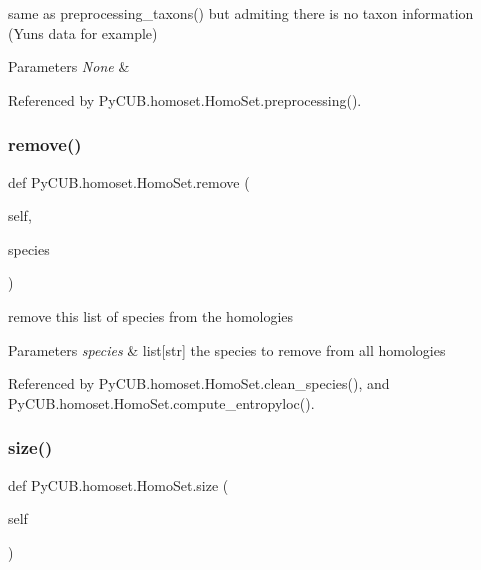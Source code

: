 same as preprocessing\+\_\+taxons() but admiting there is no taxon information (Yun\textquotesingle{}s data for example) 


\begin{DoxyParams}{Parameters}
{\em None} & \\
\hline
\end{DoxyParams}


Referenced by Py\+C\+U\+B.\+homoset.\+Homo\+Set.\+preprocessing().

\mbox{\label{class_py_c_u_b_1_1homoset_1_1_homo_set_af19ffd1cceb4b222e642713456b300a1}} 
\subsubsection{\texorpdfstring{remove()}{remove()}}
{\footnotesize\ttfamily def Py\+C\+U\+B.\+homoset.\+Homo\+Set.\+remove (\begin{DoxyParamCaption}\item[{}]{self,  }\item[{}]{species }\end{DoxyParamCaption})}



remove this list of species from the homologies 


\begin{DoxyParams}{Parameters}
{\em species} & list\mbox{[}str\mbox{]} the species to remove from all homologies \\
\hline
\end{DoxyParams}


Referenced by Py\+C\+U\+B.\+homoset.\+Homo\+Set.\+clean\+\_\+species(), and Py\+C\+U\+B.\+homoset.\+Homo\+Set.\+compute\+\_\+entropyloc().

\mbox{\label{class_py_c_u_b_1_1homoset_1_1_homo_set_a000511647e3f85d8abadcdddaddfb04d}} 
\subsubsection{\texorpdfstring{size()}{size()}}
{\footnotesize\ttfamily def Py\+C\+U\+B.\+homoset.\+Homo\+Set.\+size (\begin{DoxyParamCaption}\item[{}]{self }\end{DoxyParamCaption})}



